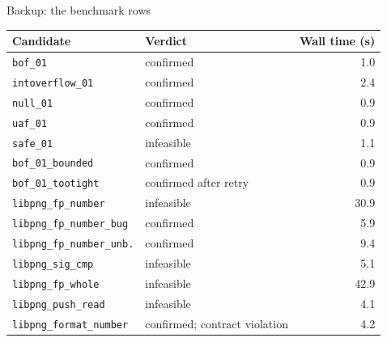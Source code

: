 \documentclass[aspectratio=169,11pt]{beamer}
\begin{document}
\begin{frame}{Backup: the benchmark rows}
  \footnotesize
  \renewcommand{\arraystretch}{1.0}
  \begin{tabular}{@{}llr@{}}
    \toprule
    \textbf{Candidate} & \textbf{Verdict} & \textbf{Wall time (s)}\\
    \midrule
    \texttt{bof\_01} & confirmed & 1.0\\
    \texttt{intoverflow\_01} & confirmed & 2.4\\
    \texttt{null\_01} & confirmed & 0.9\\
    \texttt{uaf\_01} & confirmed & 0.9\\
    \texttt{safe\_01} & infeasible & 1.1\\
    \texttt{bof\_01\_bounded} & confirmed & 0.9\\
    \texttt{bof\_01\_tootight} & confirmed after retry & 0.9\\
    \texttt{libpng\_fp\_number} & infeasible & 30.9\\
    \texttt{libpng\_fp\_number\_bug} & confirmed & 5.9\\
    \texttt{libpng\_fp\_number\_unb.} & confirmed & 9.4\\
    \texttt{libpng\_sig\_cmp} & infeasible & 5.1\\
    \texttt{libpng\_fp\_whole} & infeasible & 42.9\\
    \texttt{libpng\_push\_read} & infeasible & 4.1\\
    \texttt{libpng\_format\_number} & confirmed; contract violation & 4.2\\
    \bottomrule
  \end{tabular}
\end{frame}
\end{document}
